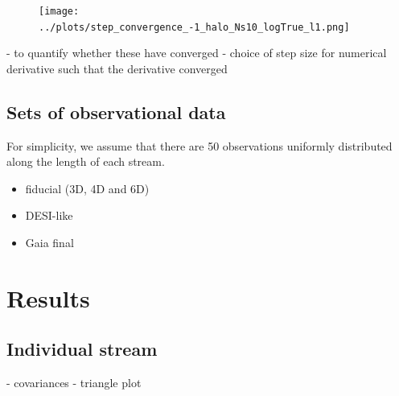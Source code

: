 \documentclass[modern]{aastex61}
\begin{document}
\begin{figure}
\begin{center}
\texttt{[image: ../plots/step\_convergence\_-1\_halo\_Ns10\_logTrue\_l1.png]}
\caption{
}
\label{fig:derivative_conv}
\end{center}
\end{figure}

- to quantify whether these have converged
- choice of step size for numerical derivative such that the derivative converged

\subsection{Sets of observational data}
For simplicity, we assume that there are 50 observations uniformly distributed along the length of each stream.


\label{sec:datasets}
\begin{itemize}
 \item fiducial (3D, 4D and 6D)
 \item DESI-like
 \item Gaia final
\end{itemize}


\section{Results}

\subsection{Individual stream}
- covariances
- triangle plot
\end{document}
